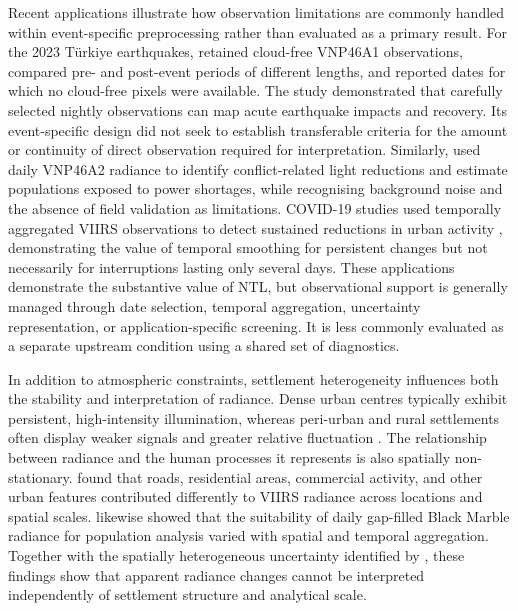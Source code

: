\documentclass[]{interact}
\theoremstyle{plain}%
\theoremstyle{definition}
\theoremstyle{remark}
\begin{document}
    Recent applications illustrate how observation limitations are commonly handled within event-specific preprocessing rather than evaluated as a primary result. For the 2023 Türkiye earthquakes, \citet{Levin2023_RS_TurkeyEarthquake} retained cloud-free VNP46A1 observations, compared pre- and post-event periods of different lengths, and reported dates for which no cloud-free pixels were available. The study demonstrated that carefully selected nightly observations can map acute earthquake impacts and recovery. Its event-specific design did not seek to establish transferable criteria for the amount or continuity of direct observation required for interpretation. Similarly, \citet{Zheng2022_RS_UkrainePower} used daily VNP46A2 radiance to identify conflict-related light reductions and estimate populations exposed to power shortages, while recognising background noise and the absence of field validation as limitations. COVID-19 studies used temporally aggregated VIIRS observations to detect sustained reductions in urban activity \citep{Elvidge2020_RS_COVID_China}, demonstrating the value of temporal smoothing for persistent changes but not necessarily for interruptions lasting only several days. These applications demonstrate the substantive value of NTL, but observational support is generally managed through date selection, temporal aggregation, uncertainty representation, or application-specific screening. It is less commonly evaluated as a separate upstream condition using a shared set of diagnostics.

    In addition to atmospheric constraints, settlement heterogeneity influences both the stability and interpretation of radiance. Dense urban centres typically exhibit persistent, high-intensity illumination, whereas peri-urban and rural settlements often display weaker signals and greater relative fluctuation \citep{Small2005_RSE_UrbanExtent}. The relationship between radiance and the human processes it represents is also spatially non-stationary. \citet{Wu2022_RS_SpatialHeterogeneity} found that roads, residential areas, commercial activity, and other urban features contributed differently to VIIRS radiance across locations and spatial scales. \citet{Martinez2023_RS_BlackMarbleSuitability} likewise showed that the suitability of daily gap-filled Black Marble radiance for population analysis varied with spatial and temporal aggregation. Together with the spatially heterogeneous uncertainty identified by \citet{Tan2023_IJAEOG_SpatialUncertainty}, these findings show that apparent radiance changes cannot be interpreted independently of settlement structure and analytical scale.
\end{document}
